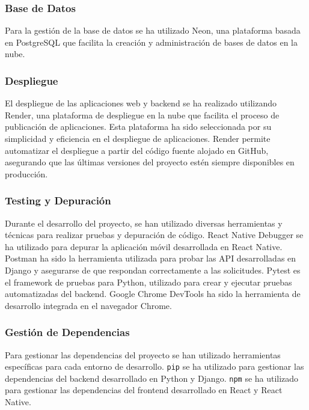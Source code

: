\subsubsection{Base de Datos}

Para la gestión de la base de datos se ha utilizado Neon, una plataforma basada en PostgreSQL que facilita la creación y administración de bases de datos en la nube.

\subsubsection{Despliegue}

El despliegue de las aplicaciones web y backend se ha realizado utilizando Render, una plataforma de despliegue en la nube que facilita el proceso de publicación de aplicaciones. Esta plataforma ha sido seleccionada por su simplicidad y eficiencia en el despliegue de aplicaciones. Render permite automatizar el despliegue a partir del código fuente alojado en GitHub, asegurando que las últimas versiones del proyecto estén siempre disponibles en producción.

\subsubsection{Testing y Depuración}

Durante el desarrollo del proyecto, se han utilizado diversas herramientas y técnicas para realizar pruebas y depuración de código. React Native Debugger \cite{ReactNativeDebugger} se ha utilizado para depurar la aplicación móvil desarrollada en React Native. Postman \cite{Postman} ha sido la herramienta utilizada para probar las API desarrolladas en Django y asegurarse de que respondan correctamente a las solicitudes. Pytest \cite{Pytest} es el framework de pruebas para Python, utilizado para crear y ejecutar pruebas automatizadas del backend. Google Chrome DevTools \cite{GoogleChromeDevTools} ha sido la herramienta de desarrollo integrada en el navegador Chrome.

\subsubsection{Gestión de Dependencias}

Para gestionar las dependencias del proyecto se han utilizado herramientas específicas para cada entorno de desarrollo. \texttt{pip} \cite{pip} se ha utilizado para gestionar las dependencias del backend desarrollado en Python y Django. \texttt{npm} \cite{npm} se ha utilizado para gestionar las dependencias del frontend desarrollado en React y React Native.